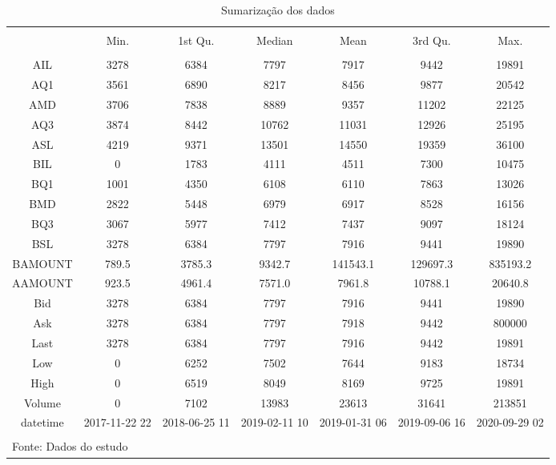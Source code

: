 
\begin{table}[!htbp] \centering 
  \caption{Sumarização dos dados} 
  \label{summary} 
\scriptsize 
\begin{tabular}{@{\extracolsep{5pt}} ccccccc} 
\\[-1.8ex]\hline 
\hline \\[-1.8ex] 
 & Min.    & 1st Qu. & Median  & Mean    & 3rd Qu. & Max.    \\ 
\hline \\[-1.8ex] 
     AIL &  3278   &  6384   &  7797   &  7917   &  9442   & 19891   \\ 
     AQ1 &  3561   &  6890   &  8217   &  8456   &  9877   & 20542   \\ 
     AMD &  3706   &  7838   &  8889   &  9357   & 11202   & 22125   \\ 
     AQ3 &  3874   &  8442   & 10762   & 11031   & 12926   & 25195   \\ 
     ASL &  4219   &  9371   & 13501   & 14550   & 19359   & 36100   \\ 
     BIL &     0   &  1783   &  4111   &  4511   &  7300   & 10475   \\ 
     BQ1 &  1001   &  4350   &  6108   &  6110   &  7863   & 13026   \\ 
     BMD &  2822   &  5448   &  6979   &  6917   &  8528   & 16156   \\ 
     BQ3 &  3067   &  5977   &  7412   &  7437   &  9097   & 18124   \\ 
     BSL &  3278   &  6384   &  7797   &  7916   &  9441   & 19890   \\ 
   BAMOUNT &    789.5   &   3785.3   &   9342.7   & 141543.1   & 129697.3   & 835193.2   \\ 
   AAMOUNT &   923.5   &  4961.4   &  7571.0   &  7961.8   & 10788.1   & 20640.8   \\ 
     Bid &  3278   &  6384   &  7797   &  7916   &  9441   & 19890   \\ 
     Ask &   3278   &   6384   &   7797   &   7918   &   9442   & 800000   \\ 
     Last &  3278   &  6384   &  7797   &  7916   &  9442   & 19891   \\ 
     Low &     0   &  6252   &  7502   &  7644   &  9183   & 18734   \\ 
     High &     0   &  6519   &  8049   &  8169   &  9725   & 19891   \\ 
    Volume &      0   &   7102   &  13983   &  23613   &  31641   & 213851   \\ 
   datetime & 2017-11-22 22 & 2018-06-25 11 & 2019-02-11 10 & 2019-01-31 06 & 2019-09-06 16 & 2020-09-29 02 \\ 
\hline \\[-1.8ex] 
\multicolumn{7}{l}{Fonte: Dados do estudo} \\ 
\end{tabular} 
\end{table} 
